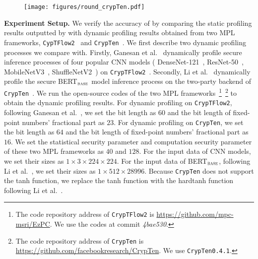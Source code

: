 \begin{figure}[ht]
    \centering
    \texttt{[image: figures/round\_crypTen.pdf]}
    \caption{}
    \label{fig:round_crypTen}
\end{figure}
\noindent\textbf{Experiment Setup.} We verify the accuracy of \hawkeye by comparing the static profiling results outputted by \hawkeye with dynamic profiling results obtained from two MPL frameworks,  \texttt{CypTFlow2}~\cite{rathee2020cryptflow2} and \texttt{CrypTen}~\cite{crypten2020}. We first describe two dynamic profiling processes we compare with.  Firstly, Ganesan et al.~\cite{ganesan2022efficient} dynamically profile secure inference processes of four popular CNN models ( DenseNet-121~\cite{Huang_2017_CVPR}, ResNet-50~\cite{7780459}, MobileNetV3~\cite{howard2019searching}, ShuffleNetV2~\cite{Ma_2018_ECCV}) on \texttt{CrypTFlow2}~\cite{rathee2020cryptflow2}. Secondly, Li et al.~\cite{li2023mpcformer} dynamically profile the secure BERT$_{\textsc{base}}$ model inference process on the two-party backend of \texttt{CrypTen}~\cite{crypten2020}.  We run the open-source codes of the two MPL frameworks~\footnote{The code repository address of \texttt{CrypTFlow2} is \url{https://github.com/mpc-msri/EzPC}. We use the codes at commit \textit{4bae530}.}~\footnote{The code repository address of \texttt{CrypTen} is \url{https://github.com/facebookresearch/CrypTen}. We use \texttt{CrypTen0.4.1}.} to obtain the dynamic profiling results. For dynamic profiling on \texttt{CrypTFlow2}, following Ganesan et al.~\cite{ganesan2022efficient}, we set the bit length as $60$ and the bit length of fixed-point numbers' fractional part as $23$. For dynamic profiling on \texttt{CrypTen}, we set the bit length as $64$ and the bit length of fixed-point numbers' fractional part as $16$. We set the statistical security parameter and computation security parameter of these two MPL frameworks as $40$ and $128$. For the input data of CNN models, we set their sizes as $1 \times 3 \times 224 \times 224$. For the input data of BERT$_{\textsc{base}}$, following Li et al.~\cite{li2023mpcformer}, we set their sizes as $1 \times 512 \times 28996$. Because \texttt{CrypTen} does not support the tanh function, we replace the tanh function with the hardtanh function following Li et al.~\cite{li2023mpcformer}. 

